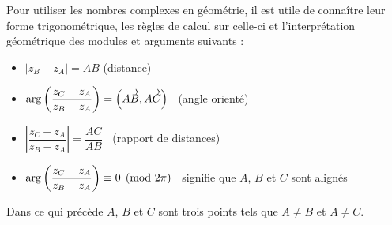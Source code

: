 \begin{methode}
Pour utiliser les nombres complexes en géométrie, il est utile de connaître leur forme trigonométrique, les règles de calcul sur celle-ci et l'interprétation géométrique des modules et arguments suivants :

\begin{itemize}
\item $|z_B - z_A| = AB$ (distance)
\item $\arg\left(\dfrac{z_C - z_A}{z_B - z_A}\right) = \left(\overrightarrow{AB}, \overrightarrow{AC}\right)\;\; $ (angle orienté)
\item $\left|\dfrac{z_C - z_A}{z_B - z_A}\right| = \dfrac{AC}{AB}\;\;$ (rapport de distances)
\item $\arg\left(\dfrac{z_C - z_A}{z_B - z_A}\right) \equiv 0 \pmod{2\pi}\;\;$ signifie que $A$, $B$ et $C$ sont alignés
\end{itemize}

Dans ce qui précède $A$, $B$ et $C$ sont trois points tels que $A \neq B$ et $A \neq C$.
\end{methode}

